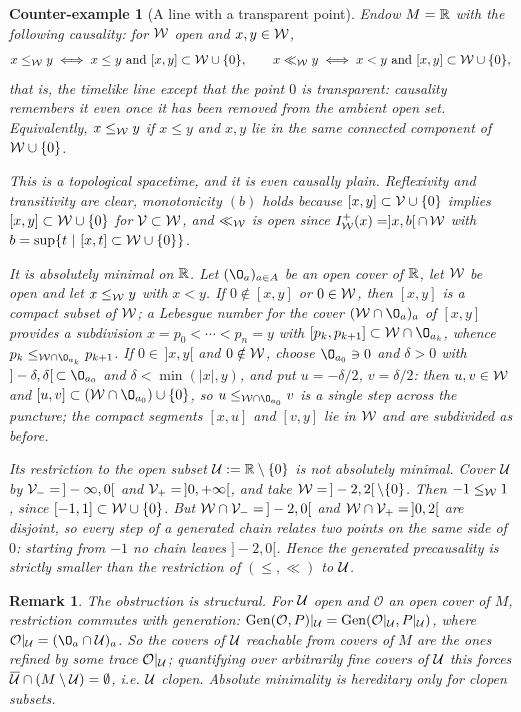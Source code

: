\documentclass[a4paper,twoside]{article}
\newtheorem{cexemple}[lem]{Counter-example}
\newtheorem{rem}[lem]{Remark}
\begin{document}
\begin{cexemple}[A line with a transparent point]\label{cexemple:point_transparent}
Endow $M=\mathbb R$ with the following causality: for $\mathcal W$ open and $x,y\in \mathcal W$,
$$x\leq_\mathcal W y \iff x\leq y \text{ and } [x,y]\subset \mathcal W\cup\{0\}, \qquad
  x\ll_\mathcal W y \iff x< y \text{ and } [x,y]\subset \mathcal W\cup\{0\},$$
that is, the timelike line except that the point $0$ is \emph{transparent}: causality remembers it even once it has been removed from the ambient open set. Equivalently, $x\leq_\mathcal W y$ if $x\leq y$ and $x,y$ lie in the same connected component of $\mathcal W\cup\{0\}$.

This is a topological spacetime, and it is even causally plain. Reflexivity and transitivity are clear, monotonicity $(b)$ holds because $[x,y]\subset \mathcal V\cup\{0\}$ implies $[x,y]\subset \mathcal W\cup\{0\}$ for $\mathcal V\subset \mathcal W$, and $\ll_\mathcal W$ is open since $I^+_\mathcal W(x)=]x,b[\,\cap\, \mathcal W$ with $b=\sup\{t~|~[x,t]\subset \mathcal W\cup\{0\}\}$.

It is absolutely minimal on $\mathbb R$. Let $(\O_a)_{a\in A}$ be an open cover of $\mathbb R$, let $\mathcal W$ be open and let $x\leq_\mathcal W y$ with $x<y$. If $0\notin[x,y]$ or $0\in \mathcal W$, then $[x,y]$ is a compact subset of $\mathcal W$; a Lebesgue number for the cover $(\W\cap \O_a)_a$ of $[x,y]$ provides a subdivision $x=p_0<\cdots<p_n=y$ with $[p_k,p_{k+1}]\subset \W\cap \O_{a_k}$, whence $p_k\leq_{\W\cap \O_{a_k}}p_{k+1}$. If $0\in\,]x,y[$ and $0\notin \mathcal W$, choose $\O_{a_0}\ni 0$ and $\delta>0$ with $]-\delta,\delta[\,\subset \O_{a_0}$ and $\delta<\min(|x|,y)$, and put $u=-\delta/2$, $v=\delta/2$: then $u,v\in \mathcal W$ and $[u,v]\subset (\W\cap \O_{a_0})\cup\{0\}$, so $u\leq_{\W\cap \O_{a_0}}v$ is a single step across the puncture; the compact segments $[x,u]$ and $[v,y]$ lie in $\mathcal W$ and are subdivided as before.

Its restriction to the open subset $\mathcal{U}:=\mathbb R\setminus\{0\}$ is \emph{not} absolutely minimal. Cover $\mathcal{U}$ by $\mathcal V_-=\,]-\infty,0[$ and $\mathcal V_+=\,]0,+\infty[$, and take $\mathcal W=\,]-2,2[\,\setminus\{0\}$. Then $-1\leq_\mathcal W 1$, since $[-1,1]\subset \mathcal W\cup\{0\}$. But $\mathcal W\cap \mathcal V_-=\,]-2,0[$ and $\mathcal W\cap \mathcal V_+=\,]0,2[$ are disjoint, so every step of a generated chain relates two points on the same side of $0$: starting from $-1$ no chain leaves $]-2,0[$. Hence the generated precausality is strictly smaller than the restriction of $(\leq,\ll)$ to $\mathcal{U}$.
\end{cexemple}

\begin{rem}\label{rem:minimalite_non_hereditaire}
The obstruction is structural. For $\mathcal{U}$ open and $\mathcal O$ an open cover of $M$, restriction commutes with generation: $\mathrm{Gen}(\mathcal O,P)|_{\mathcal{U}}=\mathrm{Gen}(\mathcal O|_{\mathcal{U}},P|_{\mathcal{U}})$, where $\mathcal O|_\U=(\O_a\cap \U)_a$. So the covers of $\mathcal{U}$ reachable from covers of $M$ are the ones refined by some trace $\mathcal O|_{\mathcal{U}}$; quantifying over arbitrarily fine covers of $\mathcal{U}$ this forces $\overline{\mathcal{U}}\cap(M\setminus \mathcal{U})=\emptyset$, i.e. $\mathcal{U}$ clopen. Absolute minimality is hereditary only for clopen subsets.
\end{rem}
\end{document}
